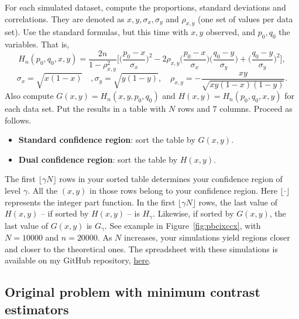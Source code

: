 \documentclass[oneside,10pt]{book}
\begin{document}
For each simulated dataset, compute the proportions, standard deviations and correlations. They are denoted as
$x , y, \sigma_x, \sigma_y$ and $\rho_{x,y}$ (one set of values per data set). Use the standard formulas, but this time with $x,y$ observed, and $p_0,q_0$ the variables. That is,
$$
H_n(p_0,q_0,x,y)=\frac{2n}{1-\rho_{x,y}^2}
\Big[\Big( \frac{p_0-x}{\sigma_x}\Big)^2
-2\rho_{x,y}\Big(\frac{p_0-x}{\sigma_x}\Big)\Big(\frac{q_0-y}{\sigma_y}\Big)
+ \Big(\frac{q_0-y}{\sigma_y}\Big)^2\Big],
$$
$$\sigma_x = \sqrt{x(1-x)}\quad, \sigma_y = \sqrt{y(1-y)},\quad \rho_{x,y}=-\frac{xy}{\sqrt{xy(1-x)(1-y)}}.$$
Also compute $G(x, y) = H_n(x, y, p_0, q_0)$ and $H(x, y) = H_n(p_0, q_0, x, y)$ for each data set. Put the results in a table with $N$ rows and $7$ columns. Proceed as follows. \vspace{1ex}

\begin{itemize}
\item {\bf Standard confidence region}: sort the table by $G(x, y)$.
\item {\bf Dual confidence region}: sort the table by $H(x, y)$.
\end{itemize}\vspace{1ex}

\noindent The first $\lfloor\gamma N\rfloor$ rows in your sorted table determines your confidence region of level $\gamma$. All the $(x, y)$ in those rows belong to your confidence region. Here $\lfloor\cdot\rfloor$ represents the integer part function. In the first $\lfloor\gamma N\rfloor$ rows, the last value of $H(x, y)$ -- if sorted by $H(x, y)$ -- is $H_\gamma$. Likewise, if sorted by $G(x, y)$, the last value of $G(x, y)$ is $G_\gamma$. See example in Figure~\ref{fig:pbcixccx}, with
$N = \num{10000}$ and $n = \num{20000}$. As $N$ increases, your simulations yield regions closer and closer to the theoretical ones. The spreadsheet with these simulations is available on my GitHub repository, \href{https://github.com/VincentGranville/Point-Processes/tree/main/Spreadsheets}{here}.

\subsection{Original problem with minimum contrast estimators}\label{orfucv}
\end{document}
